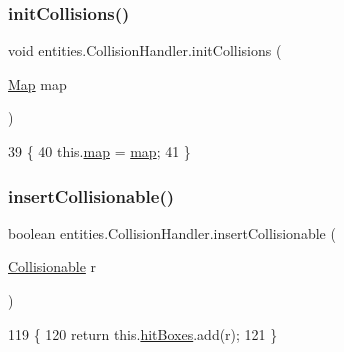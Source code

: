 \subsubsection{\texorpdfstring{init\+Collisions()}{initCollisions()}}
{\footnotesize\ttfamily void entities.\+Collision\+Handler.\+init\+Collisions (\begin{DoxyParamCaption}\item[{\mbox{\hyperlink{classentities_1_1_map}{Map}}}]{map }\end{DoxyParamCaption})\hspace{0.3cm}{\ttfamily [inline]}}


\begin{DoxyCode}
39                                         \{
40         this.\mbox{\hyperlink{classentities_1_1_collision_handler_a2490d8412bb72d221dd9f68f97565e6f}{map}} = \mbox{\hyperlink{classentities_1_1_collision_handler_a2490d8412bb72d221dd9f68f97565e6f}{map}};
41     \}
\end{DoxyCode}
\mbox{\label{classentities_1_1_collision_handler_aa81b3fa6857eeb5d4b2a06aff4dcea87}} 
\subsubsection{\texorpdfstring{insert\+Collisionable()}{insertCollisionable()}}
{\footnotesize\ttfamily boolean entities.\+Collision\+Handler.\+insert\+Collisionable (\begin{DoxyParamCaption}\item[{\mbox{\hyperlink{interfaceentities_1_1_collisionable}{Collisionable}}}]{r }\end{DoxyParamCaption})\hspace{0.3cm}{\ttfamily [inline]}}


\begin{DoxyCode}
119                                                         \{
120         \textcolor{keywordflow}{return} this.\mbox{\hyperlink{classentities_1_1_collision_handler_a4a3eab5e53bb34f16026644c4d7c0595}{hitBoxes}}.add(r);
121     \}
\end{DoxyCode}
\mbox{\label{classentities_1_1_collision_handler_a4f975e65777d79754bab90482b46cf11}} 
